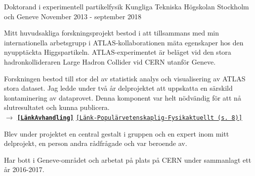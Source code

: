 


\begin{cventries}


\cventry
{Doktorand i experimentell partikelfysik} %
{Kungliga Tekniska Högskolan} %
{Stockholm och Geneve} %
{November 2013 - september 2018} %
{ %
\begin{cvitems}
\item {Mitt huvudsakliga forskningsprojekt bestod i att tillsammans med min internationella arbetsgrupp i ATLAS-kollaborationen mäta egenskaper hos den nyupptäckta Higgspartikeln. ATLAS-experimentet är beläget vid den stora hadronkollideraren Large Hadron Collider vid CERN utanför Geneve.
\item Forskningen bestod till stor del av statistisk analys och visualisering av ATLAS stora dataset. Jag ledde under två år delprojektet att uppskatta en särskild kontaminering av dataprovet. Denna komponent var helt nödvändig för att nå slutresultatet och kunna publicera. \\ 
$\rightarrow$  \href{http://kth.diva-portal.org/smash/record.jsf?pid=diva2\%3A1244395\&dswid=7018}{{\bf \texttt{[LänkAvhandling]}}} \href{http://www.fysikersamfundet.se/wp-content/uploads/Fysikaktuellt3-18_Webb.pdf}{\texttt{[Länk-Populärvetenskaplig-Fysikaktuellt (s. 8)]}} }
\item Blev under projektet en central gestalt i gruppen och en expert inom mitt delprojekt, en person andra rådfrågade och var beroende av.
\item {Har bott i Geneve-området och arbetat på plats på CERN under sammanlagt ett år 2016-2017.} %

\end{cvitems}}
\end{cventries}
